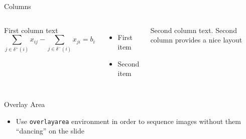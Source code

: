 \documentclass{beamer}
\begin{document}
\begin{frame}{Columns}
    \begin{columns}
        First column text
        $$ \sum_{j \in \delta^+(i)} x_{ij} - \sum_{j \in \delta^-(i)} x_{ji} = b_i$$
        
        \begin{itemize}
            \item First item
            \item Second item
        \end{itemize}

        Second column text. Second column provides a nice layout
    \end{columns}
\end{frame}

\begin{frame}[t]{Overlay Area}
    \begin{itemize}
        \item Use \texttt{overlayarea} environment in order to sequence images without them ``dancing'' on the slide
    \end{itemize}
    \begin{overlayarea}{\textwidth}{4cm}
    \end{overlayarea}
\end{frame} 
\end{document}

